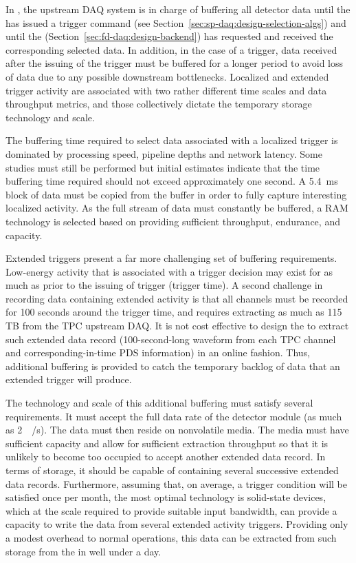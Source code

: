 In , the upstream DAQ system is in charge of buffering all
detector data until the  has issued a trigger command
(see Section~\ref{sec:sp-daq:design-selection-algs}) and until the
 (Section~\ref{sec:fd-daq:design-backend}) has requested
and received the corresponding selected data. 
In addition, in the case of a  trigger, data received after
the issuing of the trigger must be buffered for a longer period to
avoid loss of data due to any possible downstream
bottlenecks. Localized and extended trigger activity are associated
with two rather different time scales and data throughput metrics, and
those collectively dictate the temporary storage technology and scale. 

The buffering time required to select data associated with a localized
trigger is dominated by processing speed, pipeline depths and network latency. Some studies must still be performed but initial estimates indicate that the time buffering time required should not exceed approximately one second. 
A \SI{5.4}{\milli\second} block of data must be copied from the buffer
in order to fully capture interesting localized activity. As the full stream of data must constantly be buffered, a RAM
technology is selected based on providing sufficient throughput,
endurance, and capacity. 

Extended triggers present a far more challenging set of buffering requirements.  
Low-energy activity that is associated with a  trigger
decision may exist for as much as \snbpretime prior to the issuing of 
trigger (trigger time).
A second challenge in recording data containing extended activity is
that all channels must be recorded for 100 seconds around the trigger
time, and requires extracting as much as 115 TB from the TPC upstream DAQ.
It is not cost effective to design the  to extract such
extended data record (100-second-long waveform from each TPC channel
and corresponding-in-time PDS information) in an online fashion. Thus, additional buffering is provided to catch
the temporary backlog of data that an extended trigger will produce.

The technology and scale of this additional buffering must satisfy several requirements. 
It must accept the full data rate of the detector module (as much as \SI{2}{\tera\byte/\second}). 
The data must then reside on nonvolatile media. 
The media must have sufficient capacity and allow for sufficient
extraction throughput so that it is unlikely 
to become too occupied to accept another extended data record. In
terms of storage, it should be capable of containing 
several successive extended data records.
Furthermore, assuming that, on average, a  trigger condition will be
satisfied once per month, the most optimal technology is %
solid-state devices, which at the scale required to provide suitable input bandwidth, can provide a capacity to write the data from several extended activity triggers.
Providing only a modest overhead to normal operations, this data can
be extracted from such storage from the  in well under a day.

